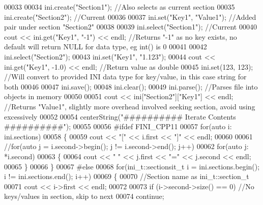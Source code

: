 \begin{DoxyCode}
00033 
00034    ini.create(\textcolor{stringliteral}{"Section1"});  \textcolor{comment}{//Also selects as current section}
00035    ini.create(\textcolor{stringliteral}{"Section2"});  \textcolor{comment}{//Current}
00036 
00037    ini.set(\textcolor{stringliteral}{"Key1"}, \textcolor{stringliteral}{"Value1"});  \textcolor{comment}{//Added pair under section "Section2"}
00038 
00039    ini.select(\textcolor{stringliteral}{"Section1"});  \textcolor{comment}{//Current}
00040    cout << ini.get(\textcolor{stringliteral}{"Key1"}, \textcolor{stringliteral}{"-1"}) << endl;  \textcolor{comment}{//Returns "-1" as no key exists, no default will return NULL for
       data type, eg int() is 0}
00041 
00042    ini.select(\textcolor{stringliteral}{"Section2"});
00043    ini.set(\textcolor{stringliteral}{"Key1"}, \textcolor{stringliteral}{"1.123"});
00044    cout << ini.get(\textcolor{stringliteral}{"Key1"}, -1.0) << endl;  \textcolor{comment}{//Return value as double}
00045    ini.set(123, 123);  \textcolor{comment}{//Will convert to provided INI data type for key/value, in this case string for both}
00046 
00047    ini.save();
00048    ini.clear();
00049    ini.parse();  \textcolor{comment}{//Parses file into objects in memory}
00050 
00051    cout << ini[\textcolor{stringliteral}{"Section2"}][\textcolor{stringliteral}{"Key1"}] << endl;  \textcolor{comment}{//Returns "Value1", slightly more overhead involved seeking
       section, avoid using excessively}
00052 
00054    centerString(\textcolor{stringliteral}{"########## Iterate Contents ##########"});
00055 
00056 \textcolor{preprocessor}{#ifdef FINI\_CPP11}
00057    \textcolor{keywordflow}{for}(\textcolor{keyword}{auto} i: ini.sections)
00058    \{
00059       cout << \textcolor{stringliteral}{"["} << i.first << \textcolor{stringliteral}{"]"} << endl;
00060 
00061       \textcolor{comment}{//for(auto j = i.second->begin(); j != i.second->end(); j++)}
00062       \textcolor{keywordflow}{for}(\textcolor{keyword}{auto} j: *i.second)
00063       \{
00064          cout << \textcolor{stringliteral}{" "} << j.first << \textcolor{stringliteral}{"="} << j.second << endl;
00065       \}
00066    \}
00067 \textcolor{preprocessor}{#else}
00068    \textcolor{keywordflow}{for}(ini\_t::sectionsit\_t i = ini.sections.begin(); i != ini.sections.end(); i++)
00069    \{
00070       \textcolor{comment}{//Section name as ini\_t::section\_t}
00071       cout << i->first << endl;
00072 
00073       \textcolor{keywordflow}{if} (i->second->size() == 0)  \textcolor{comment}{//No keys/values in section, skip to next}
00074          \textcolor{keywordflow}{continue};

\end{DoxyCode}
